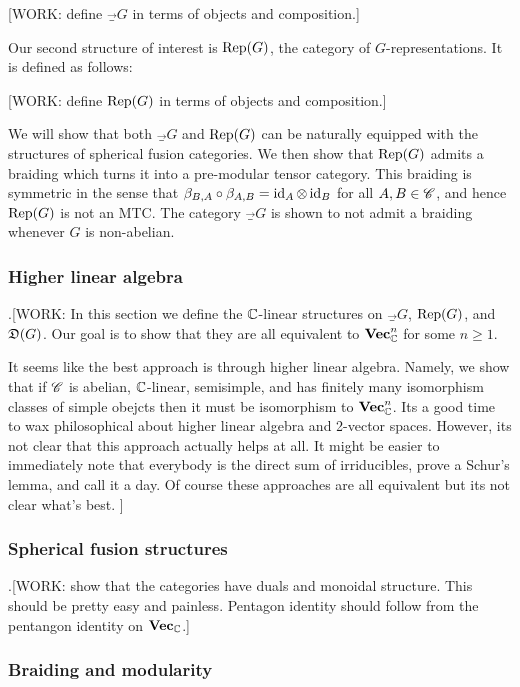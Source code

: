 [WORK: define $\Vec_G$ in terms of objects and composition.]

Our second structure of interest is $\operatorname{Rep}(G)$, the category of $G$-representations. It is defined as follows:

[WORK: define $\operatorname{Rep}(G)$ in terms of objects and composition.]

We will show that both $\Vec_G$ and $\operatorname{Rep}(G)$ can be naturally equipped with the structures of spherical fusion categories. We then show that $\operatorname{Rep}(G)$ admits a braiding which turns it into a pre-modular tensor category. This braiding is symmetric in the sense that $\beta_{B,A}\circ \beta_{A,B}=\operatorname{id}_{A}\otimes \operatorname{id}_{B}$ for all $A,B\in \mathscr{C}$, and hence $\operatorname{Rep}(G)$ is not an MTC. The category $\Vec_G$ is shown to not admit a braiding whenever $G$ is non-abelian.


\subsubsection{Higher linear algebra}

.[WORK: In this section we define the $\mathbb{C}$-linear structures on $\Vec_G$, $\operatorname{Rep}(G)$, and $\mathfrak{D}(G)$. Our goal is to show that they are all equivalent to $\mathbf{Vec}_{\mathbb{C}}^n$ for some $n\geq 1$.

It seems like the best approach is through higher linear algebra. Namely, we show that if $\mathscr{C}$ is abelian, $\mathbb{C}$-linear, semisimple, and has finitely many isomorphism classes of simple obejcts then it must be isomorphism to $\mathbf{Vec}_{\mathbb{C}}^n$. Its a good time to wax philosophical about higher linear algebra and 2-vector spaces. However, its not clear that this approach actually helps at all. It might be easier to immediately note that everybody is the direct sum of irriducibles, prove a Schur's lemma, and call it a day. Of course these approaches are all equivalent but its not clear what's best.
]

\subsubsection{Spherical fusion structures}

.[WORK: show that the categories have duals and monoidal structure. This should be pretty easy and painless. Pentagon identity should follow from the pentangon identity on $\mathbf{Vec}_{\mathbb{C}}$.]

\subsubsection{Braiding and modularity}

